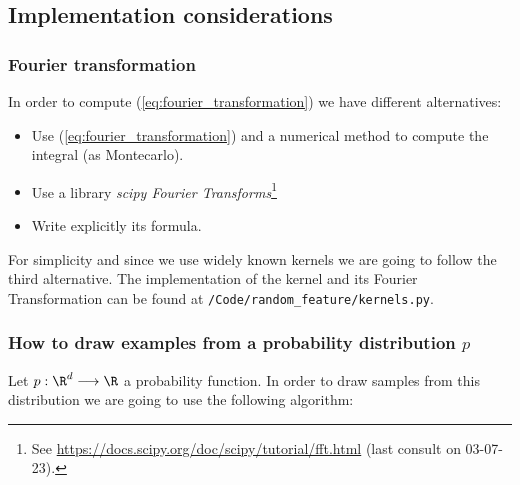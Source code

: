 \subsection{Implementation considerations}
\subsubsection{Fourier transformation}

In order to compute (\ref{eq:fourier_transformation})
we have different alternatives: 

\begin{itemize}
    \item Use (\ref{eq:fourier_transformation}) and a numerical method to compute the integral (as Montecarlo). 
    \item Use a library \textit{scipy Fourier Transforms}\footnote{
        See \url{https://docs.scipy.org/doc/scipy/tutorial/fft.html} (last consult on 03-07-23).
    }
    \item Write explicitly its formula. 
\end{itemize}

For simplicity and since we use widely known kernels we are going to follow the third alternative. 
The implementation of the kernel and its Fourier Transformation can be found at \texttt{/Code/random\_feature/kernels.py}. 

\subsubsection{How to draw examples from a probability distribution $p$}

Let $p : \R^d \longrightarrow \R$ a probability function. In order to draw samples from this distribution 
we are going to use the following algorithm: 



